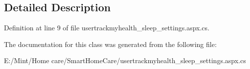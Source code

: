 \subsection{Detailed Description}


Definition at line 9 of file usertrackmyhealth\-\_\-sleep\-\_\-settings.\-aspx.\-cs.



The documentation for this class was generated from the following file\-:\begin{DoxyCompactItemize}
\item 
E\-:/\-Mint/\-Home care/\-Smart\-Home\-Care/usertrackmyhealth\-\_\-sleep\-\_\-settings.\-aspx.\-cs\end{DoxyCompactItemize}
